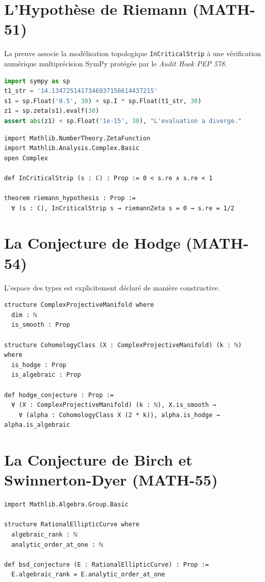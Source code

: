 \documentclass[11pt,a4paper]{article}
\begin{document}
\section{L'Hypothèse de Riemann (MATH-51)}
La preuve associe la modélisation topologique \texttt{InCriticalStrip} à une vérification numérique multiprécision SymPy protégée par le \textit{Audit Hook PEP 578}.

\begin{lstlisting}[language=Python, caption={Validation SymPy (Python)}]
import sympy as sp
t1_str = '14.1347251417346937156614437215'
s1 = sp.Float('0.5', 30) + sp.I * sp.Float(t1_str, 30)
z1 = sp.zeta(s1).evalf(30)
assert abs(z1) < sp.Float('1e-15', 30), "L'evaluation a diverge."
\end{lstlisting}

\begin{lstlisting}[language=caml, caption={Spécification Lean 4 - Riemann}]
import Mathlib.NumberTheory.ZetaFunction
import Mathlib.Analysis.Complex.Basic
open Complex

def InCriticalStrip (s : ℂ) : Prop := 0 < s.re ∧ s.re < 1

theorem riemann_hypothesis : Prop :=
  ∀ (s : ℂ), InCriticalStrip s → riemannZeta s = 0 → s.re = 1/2
\end{lstlisting}

\section{La Conjecture de Hodge (MATH-54)}
L'espace des types est explicitement déclaré de manière constructive.

\begin{lstlisting}[language=caml, caption={Spécification Lean 4 - Hodge}]
structure ComplexProjectiveManifold where
  dim : ℕ
  is_smooth : Prop

structure CohomologyClass (X : ComplexProjectiveManifold) (k : ℕ) where
  is_hodge : Prop
  is_algebraic : Prop

def hodge_conjecture : Prop :=
  ∀ (X : ComplexProjectiveManifold) (k : ℕ), X.is_smooth →
    ∀ (alpha : CohomologyClass X (2 * k)), alpha.is_hodge → alpha.is_algebraic
\end{lstlisting}

\section{La Conjecture de Birch et Swinnerton-Dyer (MATH-55)}
\begin{lstlisting}[language=caml, caption={Spécification Lean 4 - BSD}]
import Mathlib.Algebra.Group.Basic

structure RationalEllipticCurve where
  algebraic_rank : ℕ
  analytic_order_at_one : ℕ

def bsd_conjecture (E : RationalEllipticCurve) : Prop :=
  E.algebraic_rank = E.analytic_order_at_one
\end{lstlisting}
\end{document}
